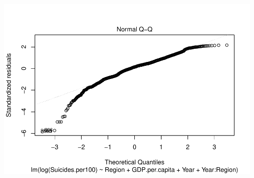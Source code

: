 \documentclass[11pt,]{article}
\begin{document}
\includegraphics{An-Analysis-of-Suicide-Data_files/figure-latex/unnamed-chunk-10-2.pdf}
\end{document}
